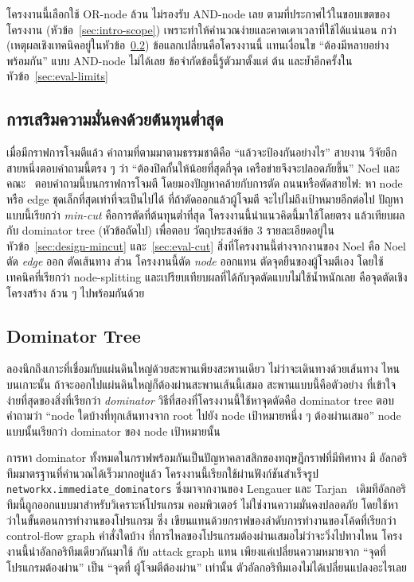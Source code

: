 โครงงานนี้เลือกใช้ OR-node ล้วน ไม่รองรับ AND-node เลย ตามที่ประกาศไว้ในขอบเขตของ
โครงงาน (หัวข้อ~\ref{sec:intro-scope}) เพราะทำให้คำนวณง่ายและคาดเดาเวลาที่ใช้ได้แน่นอน
กว่า (เหตุผลเชิงเทคนิคอยู่ในหัวข้อ~\ref{sec:theory-dominator}) ข้อแลกเปลี่ยนคือโครงงานนี้
แทนเงื่อนไข ``ต้องมีหลายอย่างพร้อมกัน'' แบบ AND-node ไม่ได้เลย ข้อจำกัดข้อนี้รู้ตัวมาตั้งแต่
ต้น และย้ำอีกครั้งในหัวข้อ~\ref{sec:eval-limits}

\subsection{การเสริมความมั่นคงด้วยต้นทุนต่ำสุด}\label{sec:theory-hardening}

เมื่อมีกราฟการโจมตีแล้ว คำถามที่ตามมาตามธรรมชาติคือ ``แล้วจะป้องกันอย่างไร'' สายงาน
วิจัยอีกสายหนึ่งตอบคำถามนี้ตรง ๆ ว่า ``ต้องปิดกั้นให้น้อยที่สุดกี่จุด เครือข่ายจึงจะปลอดภัยขึ้น''
Noel และคณะ~\cite{noel2003} ตอบคำถามนี้บนกราฟการโจมตี โดยมองปัญหาคล้ายกับการตัด
ถนนหรือตัดสายไฟ: หา node หรือ edge ชุดเล็กที่สุดเท่าที่จะเป็นไปได้ ที่ถ้าตัดออกแล้วผู้โจมตี
จะไปไม่ถึงเป้าหมายอีกต่อไป ปัญหาแบบนี้เรียกว่า \emph{min-cut} คือการตัดที่ต้นทุนต่ำที่สุด
โครงงานนี้นำแนวคิดนี้มาใช้โดยตรง แล้วเทียบผลกับ dominator tree (หัวข้อถัดไป) เพื่อตอบ
วัตถุประสงค์ข้อ 3 รายละเอียดอยู่ในหัวข้อ~\ref{sec:design-mincut} และ~\ref{sec:eval-cut}
สิ่งที่โครงงานนี้ต่างจากงานของ Noel คือ Noel ตัด \emph{edge} ออก ตัดเส้นทาง ส่วน
โครงงานนี้ตัด \emph{node} ออกแทน ตัดจุดยืนของผู้โจมตีเอง โดยใช้เทคนิคที่เรียกว่า
node-splitting และเปรียบเทียบผลที่ได้กับจุดตัดแบบไม่ใช้น้ำหนักเลย คือจุดตัดเชิงโครงสร้าง
ล้วน ๆ ไปพร้อมกันด้วย

\subsection{Dominator Tree}\label{sec:theory-dominator}

ลองนึกถึงเกาะที่เชื่อมกับแผ่นดินใหญ่ด้วยสะพานเพียงสะพานเดียว ไม่ว่าจะเดินทางด้วยเส้นทาง
ไหนบนเกาะนั้น ถ้าจะออกไปแผ่นดินใหญ่ก็ต้องผ่านสะพานเส้นนี้เสมอ สะพานแบบนี้คือตัวอย่าง
ที่เข้าใจง่ายที่สุดของสิ่งที่เรียกว่า \emph{dominator} วิธีที่สองที่โครงงานนี้ใช้หาจุดตัดคือ
dominator tree ตอบคำถามว่า ``node ใดบ้างที่ทุกเส้นทางจาก root ไปยัง node
เป้าหมายหนึ่ง ๆ ต้องผ่านเสมอ'' node แบบนั้นเรียกว่า dominator ของ node เป้าหมายนั้น

การหา dominator ทั้งหมดในกราฟพร้อมกันเป็นปัญหาคลาสสิกของทฤษฎีกราฟที่มีทิศทาง มี
อัลกอริทึมมาตรฐานที่คำนวณได้เร็วมากอยู่แล้ว โครงงานนี้เรียกใช้ผ่านฟังก์ชันสำเร็จรูป
\texttt{networkx.immediate\_dominators} ซึ่งมาจากงานของ Lengauer และ
Tarjan~\cite{lengauer1979} เดิมทีอัลกอริทึมนี้ถูกออกแบบมาสำหรับวิเคราะห์โปรแกรม
คอมพิวเตอร์ ไม่ใช่งานความมั่นคงปลอดภัย โดยใช้หาว่าในขั้นตอนการทำงานของโปรแกรม ซึ่ง
เขียนแทนด้วยกราฟของลำดับการทำงานของโค้ดที่เรียกว่า control-flow graph คำสั่งใดบ้าง
ที่การไหลของโปรแกรมต้องผ่านเสมอไม่ว่าจะวิ่งไปทางไหน โครงงานนี้นำอัลกอริทึมเดียวกันมาใช้
กับ attack graph แทน เพียงแค่เปลี่ยนความหมายจาก ``จุดที่โปรแกรมต้องผ่าน'' เป็น ``จุดที่
ผู้โจมตีต้องผ่าน'' เท่านั้น ตัวอัลกอริทึมเองไม่ได้เปลี่ยนแปลงอะไรเลย


